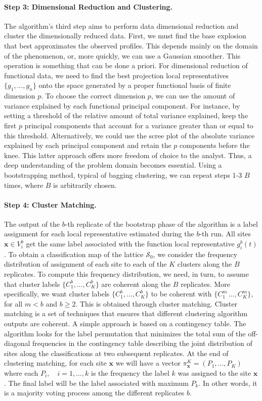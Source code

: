 \paragraph{Step 3: Dimensional Reduction and Clustering.} The algorithm's third step aims to perform data dimensional reduction and cluster the dimensionally reduced data. First, we must find the base explosion that best approximates the observed profiles. This depends mainly on the domain of the phenomenon, or, more quickly, we can use a Gaussian smoother. This operation is something that can be done a priori. For dimensional reduction of functional data, we need to find the best projection local representatives $\{g_1, \dots, g_n \}$ onto the space generated by a proper functional basis of finite dimension $p$. To choose the correct dimension $p$, we can use the amount of variance explained by each functional principal component. For instance, by setting a threshold of the relative amount of total variance explained, keep the first $p$ principal components that account for a variance greater than or equal to this threshold. Alternatively, we could use the scree plot of the absolute variance explained by each principal component and retain the $p$ components before the knee. This latter approach offers more freedom of choice to the analyst. Thus, a deep understanding of the problem domain becomes essential. Using a bootstrapping method, typical of bagging clustering, we can repeat steps 1-3 $B$ times, where $B$ is arbitrarily chosen. 
\paragraph{Step 4: Cluster Matching.} The output of the $b$-th replicate of the bootstrap phase of the algorithm is a label assignment for each local representative estimated during the $b$-th run. All sites $\mathbf{x} \in V_i^b$ get the same label associated with the function local representative $g_i^b(t)$. To obtain a classification map of the lattice $\mathcal{S}_0$, we consider the frequency distribution of assignment of each site to each of the $K$ clusters along the $B$ replicates. To compute this frequency distribution, we need, in turn, to assume that cluster labels $\{C_1^b, \dots, C_K^b\}$ are coherent along the $B$ replicates. More specifically, we want cluster labels $\{C_1^b, \dots, C_K^b\}$ to be coherent with $\{C_1^m\, \dots, C_K^m\}$, for all $m<b$ and $b\geq2$. This is obtained through cluster matching. Cluster matching is a set of techniques that ensures that different clustering algorithm outputs are coherent. A simple approach is based on a contingency table. The algorithm looks for the label permutation that minimizes the total sum of the off-diagonal frequencies in the contingency table describing the joint distribution of sites along the classifications at two subsequent replicates. At the end of clustering matching, for each site $\mathbf{x}$ we will have a vector $\pi_{\mathbf{x}}^K=\left(P_1, \dots, P_K\right)$ where each $P_i, \quad i=1,\dots,k$ is the frequency the label $k$ was assigned to the site $\mathbf{x}$. The final label will be the label associated with maximum $P_k$. In other words, it is a majority voting process among the different replicates $b$.
